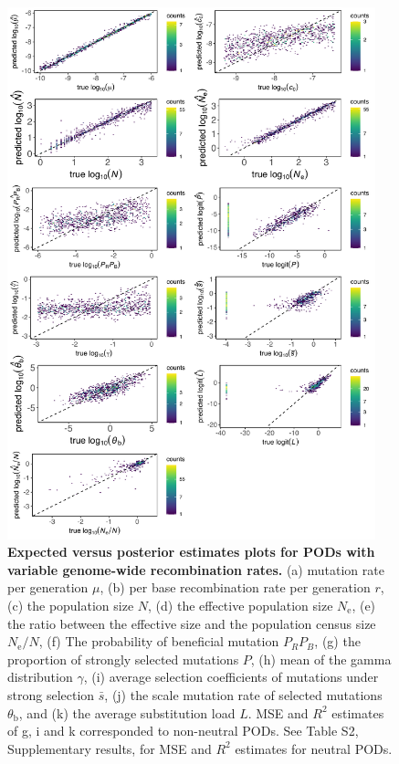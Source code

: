 \documentclass[a4paper, 12pt]{article}
\begin{document}
\begin{figure}[ht]
  \centering
  \includegraphics[width=0.95\textwidth]{Figures/FigureS6_posterior_plots_recombination.pdf}
  \small\caption{\textbf{Expected versus posterior estimates plots for PODs with variable genome-wide recombination rates.} (a) mutation rate per generation $\mu$, (b) per base recombination rate per generation $r$, (c) the population size $N$, (d) the effective population size $N_{\mathrm{e}}$, (e) the ratio between the effective size and the population census size $N_{\mathrm{e}}/N$, (f) The probability of beneficial mutation $P_RP_B$, (g) the proportion of strongly selected mutations $P$, (h) mean of the gamma distribution $\gamma$, (i) average selection coefficients of mutations under strong selection $\bar{s}$, (j) the scale mutation rate of selected mutations $\theta_{\mathrm{b}}$, and (k) the average substitution load $L$. MSE and $R^2$ estimates of g, i and k corresponded to non-neutral PODs. See Table S2, Supplementary results, for MSE and $R^2$ estimates for neutral PODs.}
  \label{fig:supple_pods_variable_recomb}
\end{figure}
\end{document}

